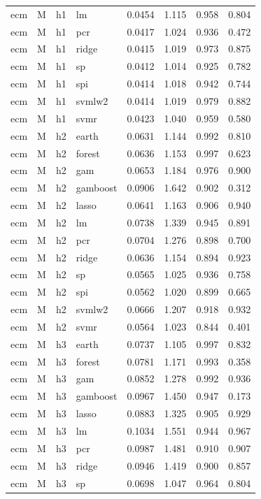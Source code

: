 \begin{ThreePartTable}
\begin{longtable}[t]{llclcccc}
ecm & M & h1 & lm & 0.0454 & 1.115 & 0.958 & 0.804\\
ecm & M & h1 & pcr & 0.0417 & 1.024 & 0.936 & 0.472\\
ecm & M & h1 & ridge & 0.0415 & 1.019 & 0.973 & 0.875\\
ecm & M & h1 & sp & 0.0412 & 1.014 & 0.925 & 0.782\\
ecm & M & h1 & spi & 0.0414 & 1.018 & 0.942 & 0.744\\
ecm & M & h1 & svmlw2 & 0.0414 & 1.019 & 0.979 & 0.882\\
ecm & M & h1 & svmr & 0.0423 & 1.040 & 0.959 & 0.580\\
\addlinespace
ecm & M & h2 & earth & 0.0631 & 1.144 & 0.992 & 0.810\\
ecm & M & h2 & forest & 0.0636 & 1.153 & 0.997 & 0.623\\
ecm & M & h2 & gam & 0.0653 & 1.184 & 0.976 & 0.900\\
ecm & M & h2 & gamboost & 0.0906 & 1.642 & 0.902 & 0.312\\
ecm & M & h2 & lasso & 0.0641 & 1.163 & 0.906 & 0.940\\
ecm & M & h2 & lm & 0.0738 & 1.339 & 0.945 & 0.891\\
ecm & M & h2 & pcr & 0.0704 & 1.276 & 0.898 & 0.700\\
ecm & M & h2 & ridge & 0.0636 & 1.154 & 0.894 & 0.923\\
ecm & M & h2 & sp & 0.0565 & 1.025 & 0.936 & 0.758\\
ecm & M & h2 & spi & 0.0562 & 1.020 & 0.899 & 0.665\\
ecm & M & h2 & svmlw2 & 0.0666 & 1.207 & 0.918 & 0.932\\
ecm & M & h2 & svmr & 0.0564 & 1.023 & 0.844 & 0.401\\
\addlinespace
ecm & M & h3 & earth & 0.0737 & 1.105 & 0.997 & 0.832\\
ecm & M & h3 & forest & 0.0781 & 1.171 & 0.993 & 0.358\\
ecm & M & h3 & gam & 0.0852 & 1.278 & 0.992 & 0.936\\
ecm & M & h3 & gamboost & 0.0967 & 1.450 & 0.947 & 0.173\\
ecm & M & h3 & lasso & 0.0883 & 1.325 & 0.905 & 0.929\\
ecm & M & h3 & lm & 0.1034 & 1.551 & 0.944 & 0.967\\
ecm & M & h3 & pcr & 0.0987 & 1.481 & 0.910 & 0.907\\
ecm & M & h3 & ridge & 0.0946 & 1.419 & 0.900 & 0.857\\
ecm & M & h3 & sp & 0.0698 & 1.047 & 0.964 & 0.804\\

\end{longtable}
\end{ThreePartTable}
